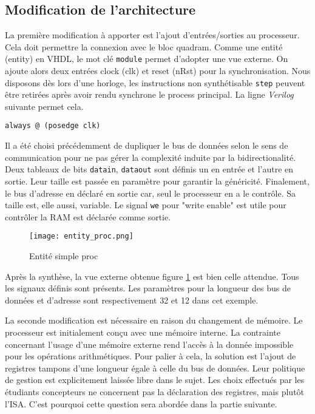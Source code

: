 \subsection{Modification de l'architecture}
La première modification à apporter est l'ajout d'entrées/sorties au processeur.
Cela doit permettre la connexion avec le bloc quadram.
Comme une entité (entity) en VHDL, le mot clé \texttt{module} permet d'adopter une vue externe.
On ajoute alors deux entrées clock (clk) et reset (nRst) pour la synchronisation.
Nous disposons dès lors d'une horloge, les instructions non synthétisable \texttt{step} peuvent être retirées après avoir rendu synchrone le process principal. La ligne \textit{Verilog} suivante permet cela.
\begin{lstlisting}[style=vhdl]
    always @ (posedge clk)
\end{lstlisting}
Il a été choisi précédemment de dupliquer le bus de données selon le sens de communication pour ne pas gérer la complexité induite par la bidirectionalité. Deux tableaux de bits \texttt{datain}, \texttt{dataout} sont définis un en entrée et l'autre en sortie. Leur taille est passée en paramètre pour garantir la généricité. Finalement, le bus d'adresse en déclaré en sortie car, seul le processeur en a le contrôle. Sa taille est, elle aussi, variable.
Le signal \texttt{we} pour "write enable" est utile pour contrôler la \gls{RAM} est déclarée comme sortie.
\begin{figure}[h]
    \centering
    \texttt{[image: entity\_proc.png]}
    \caption{Entité simple proc}
    \label{entity_proc}
\end{figure}

Après la synthèse, la vue externe obtenue figure \ref{entity_proc} est bien celle attendue.
Tous les signaux définis sont présents. Les paramètres pour la longueur des bus de données et d'adresse sont respectivement 32 et 12 dans cet exemple. \\
\gap

La seconde modification est nécessaire en raison du changement de mémoire.
Le processeur est initialement conçu avec une mémoire interne.
La contrainte concernant l'usage d'une mémoire externe rend l'accès à la donnée impossible pour les opérations arithmétiques.
Pour palier à cela, la solution est l'ajout de registres tampons d'une longueur égale à celle du bus de données.
Leur politique de gestion est explicitement laissée libre dans le sujet.
Les choix effectués par les étudiants concepteurs ne concernent pas la déclaration des registres, mais plutôt l'\gls{ISA}.
C'est pourquoi cette question sera abordée dans la partie suivante. \\
\gap

